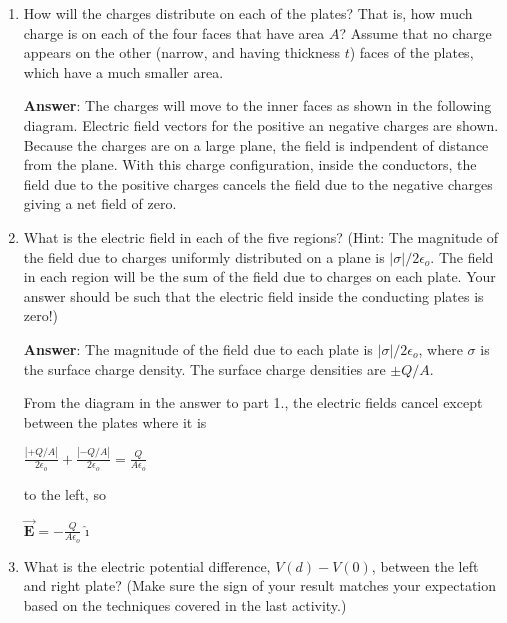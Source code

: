 \documentclass{article}
\newcommand{\ds}[0]{\displaystyle}
\newcommand{\ihat}[0]{\hat{\boldsymbol{\imath}}}
\newcommand{\bfvec}[1]{\vec{\mathbf{#1}}}
\begin{document}
\begin{enumerate}

  \item How will the charges distribute on each of the plates? That is, how much charge is on each of the four faces that have area $A$? Assume that no charge appears on the other (narrow, and having thickness $t$) faces of the plates, which have a much smaller area.

     \ifsolutions
       {\bf Answer}: The charges will move to the inner faces as shown in the following diagram. Electric field vectors for the positive an negative charges are shown. Because the charges are on a large plane, the field is indpendent of distance from the plane. With this charge configuration, inside the conductors, the field due to the positive charges cancels the field due to the negative charges giving a net field of zero.

       
     \else
       \vskip 36pt
     \fi
     \ifsolutions\else
     \vskip 36pt
     \fi

  \item What is the electric field in each of the five regions? (Hint: The magnitude of the field due to charges uniformly distributed on a plane is $|\sigma|/2\epsilon_o$. The field in each region will be the sum of the field due to charges on each plate. Your answer should be such that the electric field inside the conducting plates is zero!)

     \ifsolutions
       {\bf Answer}: The magnitude of the field due to each plate is $|\sigma|/2\epsilon_o$, where $\sigma$ is the surface charge density. The surface charge densities are $\pm Q/A$.  

       

       From the diagram in the answer to part 1., the electric fields cancel except between the plates where it is 

       $\ds\frac{|+Q/A|}{2\epsilon_o} + \frac{|-Q/A|}{2\epsilon_o} = \frac{Q}{A\epsilon_o}$

       to the left, so

       $\ds\bfvec{E}=-\frac{Q}{A\epsilon_o}\ihat$
     \else
       \vskip 36pt
     \fi
     \ifsolutions\else
     \vskip 36pt
     \fi

  \item What is the electric potential difference, $V(d)-V(0)$, between the left and right plate? (Make sure the sign of your result matches your expectation based on the techniques covered in the last activity.)


\end{enumerate}
\end{document}
